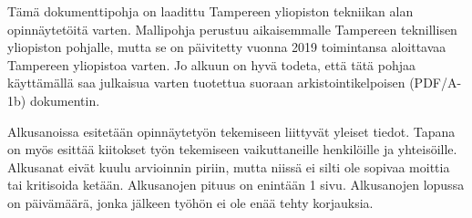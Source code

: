 Tämä dokumenttipohja on laadittu Tampereen yliopiston tekniikan alan opinnäytetöitä varten. Mallipohja perustuu aikaisemmalle Tampereen teknillisen yliopiston pohjalle, mutta se on päivitetty vuonna 2019 toimintansa aloittavaa Tampereen yliopistoa varten. Jo alkuun on hyvä todeta, että tätä pohjaa käyttämällä saa julkaisua varten tuotettua suoraan arkistointikelpoisen (PDF/A-1b) dokumentin.

Alkusanoissa esitetään opinnäytetyön tekemiseen liittyvät yleiset tiedot. Tapana on myös esittää kiitokset työn tekemiseen vaikuttaneille henkilöille ja yhteisöille. Alkusanat eivät kuulu arvioinnin piriin, mutta niissä ei silti ole sopivaa moittia tai kritisoida ketään. Alkusanojen pituus on enintään 1 sivu. Alkusanojen lopussa on päivämäärä, jonka jälkeen työhön ei ole enää tehty korjauksia.